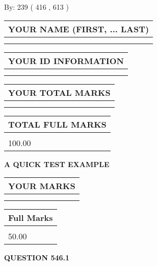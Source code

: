 \documentclass[12pt]{article}
\begin{document}
   
\hspace{1.0in} By: 
 239 ( 416 ,  613 )
   
   
   
   
\newpage 
\setcounter{page}{ 
   546001 } 
   
   
   
   
\noindent\begin{tabular}{|l|}
\hline
YOUR NAME (FIRST, ... LAST)  \\
\hline
 \\ 
 \\ 
\hline
\end{tabular}
\hspace{0.05in} \begin{tabular}{|l|}
\hline
 YOUR   ID   INFORMATION  \\
\hline
 \\ 
 \\ 
\hline
\end{tabular}
   
   
\vspace{0.2in}\noindent\begin{tabular}{|l|}
\hline
YOUR TOTAL MARKS  \\
\hline
 \\ 
 \\ 
\hline
\end{tabular}
\hspace{0.05in} \begin{tabular}{|l|}
\hline
TOTAL FULL MARKS  \\
\hline
 \\ 
100.00 \\
\hline
\end{tabular}
   
   
 \vspace{0.2in}
{\LARGE {\textbf{ A QUICK TEST EXAMPLE}}}
   
   
  
\vspace{0.2in}
  
\noindent\begin{tabular}{|l|}
\hline
 YOUR MARKS  \\
\hline
 \\ 
 \\ 
\hline
\end{tabular}
\hspace{0.05in} \begin{tabular}{|l|}
\hline
 Full Marks  \\
\hline
 \\ 
50.00 \\
\hline
\end{tabular}
{\textbf{\Large{QUESTION
546.1 
}}}
  
\end{document}
